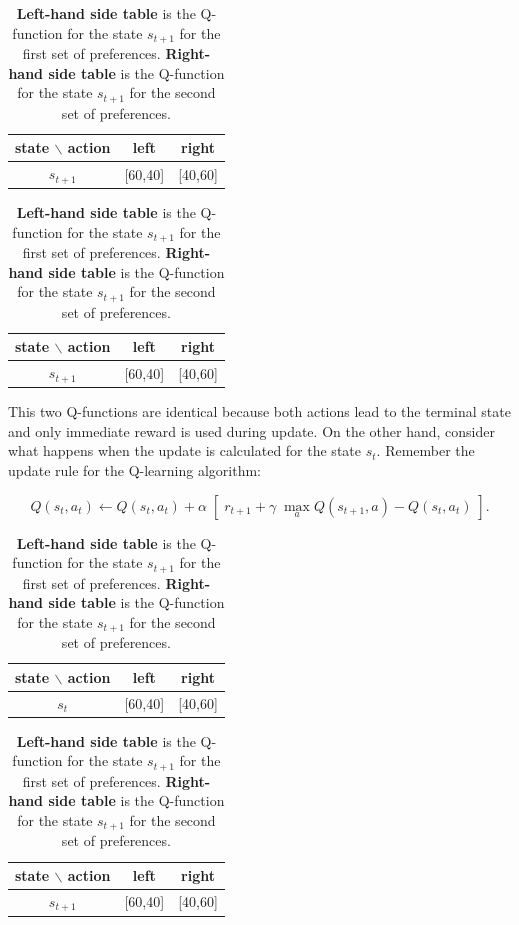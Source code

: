 {\renewcommand{\arraystretch}{1.2}
\begin{table}[!htb]
    \caption{\textbf{Left-hand side table} is the Q-function for the state $s_{t+1}$ for the first set of preferences. \textbf{Right-hand side table} is the Q-function for the state $s_{t+1}$ for the second set of preferences.}
    \begin{minipage}{.5\linewidth}
      \centering
        \begin{tabular}{c|c|c}
            state $\backslash$ action & left & right \\
            \hline
            $s_{t+1}$ & [60,40] & [40,60]
        \end{tabular}
    \end{minipage}%
    \begin{minipage}{.5\linewidth}
      \centering
        \begin{tabular}{c|c|c}
            state $\backslash$ action & left & right \\
            \hline
            $s_{t+1}$ & [60,40] & [40,60]
        \end{tabular}
    \end{minipage}
\end{table}

This two Q-functions are identical because both actions lead to the terminal state and only immediate reward is used during update. On the other hand, consider what happens when the update is calculated for the state $s_{t}$. Remember the update rule for the Q-learning algorithm: 

$$ Q(s_{t},a_{t}) \leftarrow Q(s_{t},a_{t}) + \alpha \; \left[\;r_{t+1} + \gamma\; \max_{a}Q(s_{t+1},a) - Q(s_{t},a_{t})\;\right]. $$

{\renewcommand{\arraystretch}{1.2}
\begin{table}[!htb]
    \caption{\textbf{Left-hand side table} is the Q-function for the state $s_{t+1}$ for the first set of preferences. \textbf{Right-hand side table} is the Q-function for the state $s_{t+1}$ for the second set of preferences.}
    \begin{minipage}{.5\linewidth}
      \centering
        \begin{tabular}{c|c|c}
            state $\backslash$ action & left & right \\
            \hline
            $s_{t}$ & [60,40] & [40,60]
        \end{tabular}
    \end{minipage}%
    \begin{minipage}{.5\linewidth}
      \centering
        \begin{tabular}{c|c|c}
            state $\backslash$ action & left & right \\
            \hline
            $s_{t+1}$ & [60,40] & [40,60]
        \end{tabular}
    \end{minipage}
\end{table}

}}
